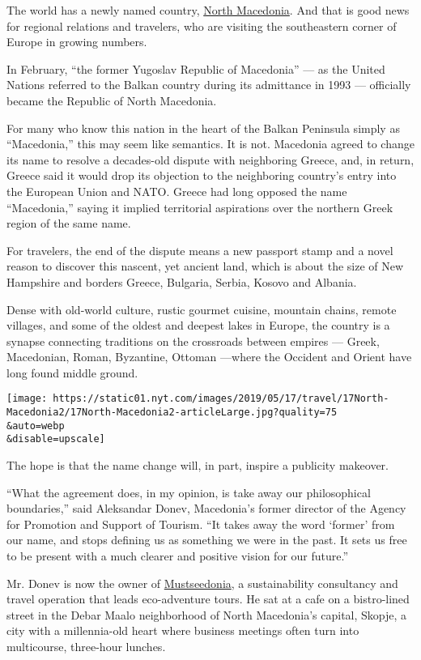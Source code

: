 The world has a newly named country,
\href{https://www.nytimes.com/2020/07/14/world/europe/north-macedonia-election-zoran-zaev.html}{North
Macedonia}. And that is good news for regional relations and travelers,
who are visiting the southeastern corner of Europe in growing numbers.

In February, ``the former Yugoslav Republic of Macedonia'' --- as the
United Nations referred to the Balkan country during its admittance in
1993 --- officially became the Republic of North Macedonia.

For many who know this nation in the heart of the Balkan Peninsula
simply as ``Macedonia,'' this may seem like semantics. It is not.
Macedonia agreed to change its name to resolve a decades-old dispute
with neighboring Greece, and, in return, Greece said it would drop its
objection to the neighboring country's entry into the European Union and
NATO. Greece had long opposed the name ``Macedonia,'' saying it implied
territorial aspirations over the northern Greek region of the same name.

For travelers, the end of the dispute means a new passport stamp and a
novel reason to discover this nascent, yet ancient land, which is about
the size of New Hampshire and borders Greece, Bulgaria, Serbia, Kosovo
and Albania.

Dense with old-world culture, rustic gourmet cuisine, mountain chains,
remote villages, and some of the oldest and deepest lakes in Europe, the
country is a synapse connecting traditions on the crossroads between
empires --- Greek, Macedonian, Roman, Byzantine, Ottoman ---where the
Occident and Orient have long found middle ground.

\texttt{[image: https://static01.nyt.com/images/2019/05/17/travel/17North-Macedonia2/17North-Macedonia2-articleLarge.jpg?quality=75\\\&auto=webp\\\&disable=upscale]}

The hope is that the name change will, in part, inspire a publicity
makeover.

``What the agreement does, in my opinion, is take away our philosophical
boundaries,'' said Aleksandar Donev, Macedonia's former director of the
Agency for Promotion and Support of Tourism. ``It takes away the word
`former' from our name, and stops defining us as something we were in
the past. It sets us free to be present with a much clearer and positive
vision for our future.''

Mr. Donev is now the owner of
\href{http://www.mustseedonia.com/}{Mustseedonia}, a sustainability
consultancy and travel operation that leads eco-adventure tours. He sat
at a cafe on a bistro-lined street in the Debar Maalo neighborhood of
North Macedonia's capital, Skopje, a city with a millennia-old heart
where business meetings often turn into multicourse, three-hour lunches.

